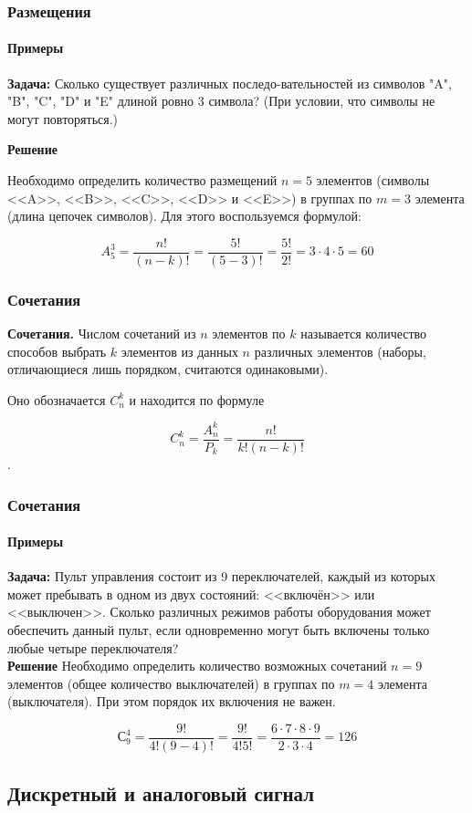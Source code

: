 \begin{frame}
\frametitle{Размещения}
\framesubtitle{Примеры}
\textbf{Задача:} Сколько существует различных последо-вательностей из символов "A", "B", "C", "D" и "E" длиной ровно 3 символа? (При условии, что символы не могут повторяться.)

\pause
\textbf{Решение}

Необходимо определить количество размещений $n = 5$ элементов (символы <<A>>, <<B>>, <<C>>, <<D>> и <<E>>) в группах по $m = 3$ элемента (длина цепочек символов). Для этого воспользуемся формулой:

$$A_5^3=\frac{n!}{(n-k)!}=\frac{5!}{(5-3)!}=\frac{5!}{2!}=3\cdot4\cdot5=60$$

\end{frame}

\begin{frame}
\frametitle{Сочетания}
{\bf Сочетания.} Числом сочетаний из $n$ 
элементов по $k$ называется количество способов выбрать $k$ элементов из данных
$n$ различных элементов (наборы, отличающиеся лишь порядком, считаются
одинаковыми). 

Оно обозначается $C_n^k$ и находится по формуле

$$C_n^k=\frac{A_n^k}{P_k}=\frac{n!}{k!(n-k)!}$$.


\end{frame}



\begin{frame}
\frametitle{Сочетания}
\framesubtitle{Примеры}
\textbf{Задача:} Пульт управления состоит из 9 переключателей, каждый из которых может пребывать в одном из двух состояний: <<включён>> или <<выключен>>. Сколько различных режимов работы оборудования может обеспечить данный пульт, если одновременно могут быть включены только любые четыре переключателя? \\
\textbf{Решение}
Необходимо определить количество возможных сочетаний $n = 9$ элементов (общее количество выключателей) в группах по $m = 4$ элемента (выключателя). При этом порядок их включения не важен.

$$С_9^4=\frac{9!}{4!(9-4)!}=\frac{9!}{4!5!}=\frac{6\cdot 7\cdot 8\cdot 9}{2\cdot 3\cdot 4}=126$$

\end{frame}

 \subsection{Дискретный и аналоговый сигнал}

